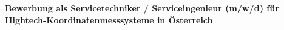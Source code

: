 \textbf{Bewerbung als Servicetechniker / Serviceingenieur (m/w/d) für Hightech-Koordinatenmesssysteme in Österreich}
